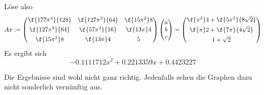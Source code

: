 \documentclass{mywork}
\begin{document}
\begin{aufgabe}
\begin{enumerate}
\[				\]
				Löse also
				\[
					Ax := \begin{pmatrix}\f{177\pi^4}{128} & \f{127\pi^3}{64} & \f{15\pi^2}8\\[0.4em]\f{127\pi^3}{64} & \f{57\pi^2}{16} & \f{13\pi}4\\[0.4em] \f{15\pi^2}8 & \f{13\pi}4 & 5\end{pmatrix}\begin{pmatrix}a\\b\\c\end{pmatrix} = \begin{pmatrix}\f{\pi^2}4+\f{5\pi^2}{8\sqrt{2}}\\[0.4em]\f{\pi}2+\f{7\pi}{4\sqrt{2}}\\[0.4em]1+\sqrt{2}\end{pmatrix}
				\]
				Es ergibt sich
				\[
					-0.1111712x^2 + 0.2213359x + 0.4423227
				\]
		\end{enumerate}
		\begin{note}
			Die Ergebnisse sind wohl nicht ganz richtig.
			Jedenfalls sehen die Graphen dazu nicht sonderlich vernünftig aus.
		\end{note}
	\end{aufgabe}
	\newpage
\end{document}
